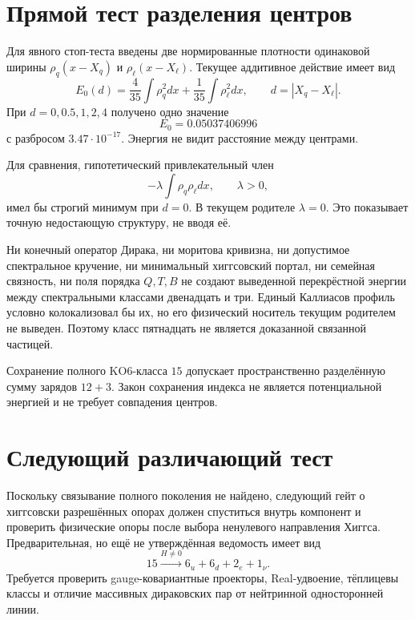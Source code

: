 \section{Прямой тест разделения центров}

Для явного стоп-теста введены две нормированные плотности одинаковой
ширины $\rho_q(x-X_q)$ и $\rho_\ell(x-X_\ell)$. Текущее аддитивное
действие имеет вид
\begin{equation}
 E_0(d)=\frac4{35}\int\rho_q^2dx
       +\frac1{35}\int\rho_\ell^2dx,
 \qquad
 d=|X_q-X_\ell|.
\end{equation}
При $d=0,0.5,1,2,4$ получено одно значение
\begin{equation}
 E_0=0.05037406996
\end{equation}
с разбросом $3.47\cdot10^{-17}$. Энергия не видит расстояние между
центрами.

Для сравнения, гипотетический привлекательный член
\begin{equation}
 -\lambda\int\rho_q\rho_\ell dx,
 \qquad \lambda>0,
\end{equation}
имел бы строгий минимум при $d=0$. В текущем родителе
$\lambda=0$. Это показывает точную недостающую структуру, не вводя её.

\begin{theorem}
Ни конечный оператор Дирака, ни моритова кривизна, ни допустимое
спектральное кручение, ни минимальный хиггсовский портал, ни семейная
связность, ни поля порядка $Q,T,B$ не создают выведенной перекрёстной
энергии между спектральными классами двенадцать и три. Единый
Каллиасов профиль условно колокализовал бы их, но его физический носитель
текущим родителем не выведен. Поэтому класс пятнадцать не является
доказанной связанной частицей.
\end{theorem}

\begin{remark}
Сохранение полного KO6-класса $15$ допускает пространственно разделённую
сумму зарядов $12+3$. Закон сохранения индекса не является потенциальной
энергией и не требует совпадения центров.
\end{remark}

\section{Следующий различающий тест}

Поскольку связывание полного поколения не найдено, следующий гейт о
хиггсовски разрешённых опорах должен спуститься внутрь компонент и
проверить физические опоры после
выбора ненулевого направления Хиггса. Предварительная, но ещё не
утверждённая ведомость имеет вид
\begin{equation}
 15\stackrel{H\neq0}{\longrightarrow}6_u+6_d+2_e+1_\nu.
\end{equation}
Требуется проверить gauge-ковариантные проекторы, Real-удвоение,
тёплицевы классы и отличие массивных дираковских пар от нейтринной
односторонней линии.

